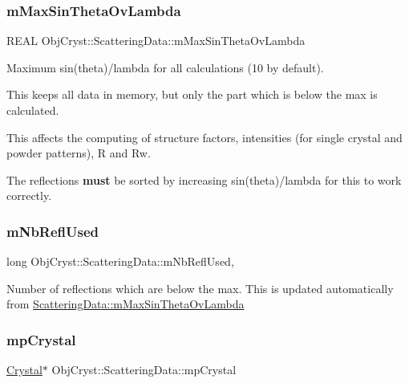 \subsubsection{\texorpdfstring{mMaxSinThetaOvLambda}{mMaxSinThetaOvLambda}}
{\footnotesize\ttfamily R\+E\+AL Obj\+Cryst\+::\+Scattering\+Data\+::m\+Max\+Sin\+Theta\+Ov\+Lambda\hspace{0.3cm}{\ttfamily [protected]}}

Maximum sin(theta)/lambda for all calculations (10 by default).

This keeps all data in memory, but only the part which is below the max is calculated.

This affects the computing of structure factors, intensities (for single crystal and powder patterns), R and Rw.

The reflections {\bfseries{must}} be sorted by increasing sin(theta)/lambda for this to work correctly. \mbox{\label{class_obj_cryst_1_1_scattering_data_a00e0972eebd70ae92231b804884a83b6}} 
\subsubsection{\texorpdfstring{mNbReflUsed}{mNbReflUsed}}
{\footnotesize\ttfamily long Obj\+Cryst\+::\+Scattering\+Data\+::m\+Nb\+Refl\+Used\hspace{0.3cm}{\ttfamily [mutable]}, {\ttfamily [protected]}}

Number of reflections which are below the max. This is updated automatically from \mbox{\hyperlink{class_obj_cryst_1_1_scattering_data_acb0398e21f803308b79103182906f6c5}{Scattering\+Data\+::m\+Max\+Sin\+Theta\+Ov\+Lambda}} \mbox{\label{class_obj_cryst_1_1_scattering_data_a8c4e778a97e93098d585ffdc597dbb54}} 
\subsubsection{\texorpdfstring{mpCrystal}{mpCrystal}}
{\footnotesize\ttfamily \mbox{\hyperlink{class_obj_cryst_1_1_crystal}{Crystal}}$\ast$ Obj\+Cryst\+::\+Scattering\+Data\+::mp\+Crystal\hspace{0.3cm}{\ttfamily [protected]}}

